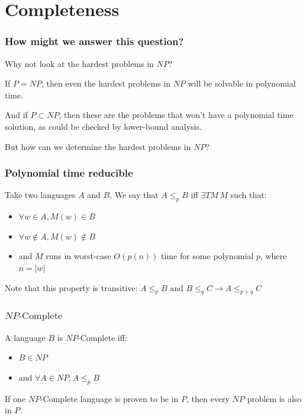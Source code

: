 \documentclass[aspectratio=169]{beamer}
\begin{document}
\section{Completeness}

\begin{frame}
\frametitle{How might we answer this question?}

Why not look at the hardest problems in $NP$?

If $P = NP$, then even the hardest problems in $NP$ will be solvable in polynomial time.

And if $P \subset NP$, then these are the problems that won't have a polynomial time solution, as could be checked by lower-bound analysis.

But how can we determine the hardest problems in $NP$?
\end{frame}

\begin{frame}
\frametitle{Polynomial time reducible}

Take two languages $A$ and $B$. We say that $A \leq_p B$ iff $\exists TM\, M$ such that:

\begin{itemize}
    \item $\forall w \in A, M(w) \in B$
    \item $\forall w \notin A, M(w) \notin B$
    \item and $M$ runs in worst-case $O(p(n))$ time for some polynomial $p$, where $n = |w|$
\end{itemize}

Note that this property is transitive: $A \leq_p B \text{ and } B \leq_q C \to A \leq_{p + q} C$

\end{frame}

\begin{frame}
\frametitle{$NP\text{-Complete}$}

A language $B$ is $NP\text{-Complete}$ iff:

\begin{itemize}
    \item $B \in NP$
    \item and $\forall A \in NP, A \leq_p B$
\end{itemize}

If one $NP\text{-Complete}$ language is proven to be in $P$, then every $NP$ problem is also in $P$.
\end{frame}
\end{document}
